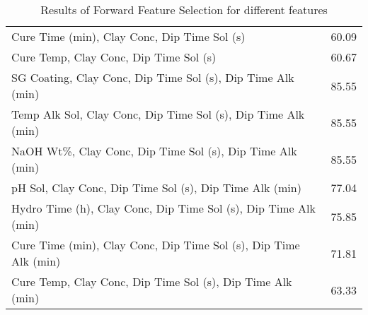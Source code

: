 \begin{table*}[h]
\begin{tabular}{lr}
 Cure Time (min), Clay Conc, Dip Time Sol (s)                     &  60.09 \\
 Cure Temp, Clay Conc, Dip Time Sol (s)                           &  60.67 \\
 SG Coating, Clay Conc, Dip Time Sol (s), Dip Time Alk (min)      &  85.55 \\
 Temp Alk Sol, Clay Conc, Dip Time Sol (s), Dip Time Alk (min)    &  85.55 \\
 NaOH Wt\%, Clay Conc, Dip Time Sol (s), Dip Time Alk (min)       &  85.55 \\
 pH Sol, Clay Conc, Dip Time Sol (s), Dip Time Alk (min)          &  77.04 \\
 Hydro Time (h), Clay Conc, Dip Time Sol (s), Dip Time Alk (min)  &  75.85 \\
 Cure Time (min), Clay Conc, Dip Time Sol (s), Dip Time Alk (min) &  71.81 \\
 Cure Temp, Clay Conc, Dip Time Sol (s), Dip Time Alk (min)       &  63.33 \\
\hline
\end{tabular}
        \caption{Results of Forward Feature Selection for different features}
        \label{forward}
    \end{table*}
    
